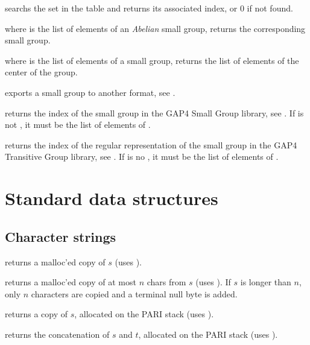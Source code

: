  searchs the set  in
the table  and returns its associated index, or $0$ if not found.

 where  is the list of
elements of an \emph{Abelian} small group, returns the corresponding
small group.

 where  is the list of elements
of a small group, returns the list of elements of the center of the
group.

 exports a small group
to another format, see .

 returns the index of the small group
 in the GAP4 Small Group library, see . If
 is not , it must be the list of elements of .

 returns the index of the
regular representation of the small group  in the GAP4 Transitive
Group library, see . If  is no , it must be
the list of elements of .

\newpage
\chapter{Standard data structures}

\section{Character strings}


 returns a malloc'ed copy of $s$
(uses ).

 returns a malloc'ed copy of
at most $n$ chars from $s$ (uses ). If $s$ is longer than
$n$, only $n$ characters are copied and a terminal null byte is added.

 returns a copy of $s$, allocated
on the PARI stack (uses ).

 returns the
concatenation of $s$ and $t$, allocated on the PARI stack (uses
).

